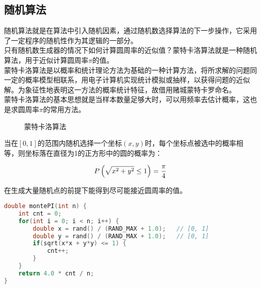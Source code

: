 \vspace{0.5cm}

\subsection{随机算法}

随机算法就是在算法中引入随机因素，通过随机数选择算法的下一步操作，它采用了一定程序的随机性作为其逻辑的一部分。\\

只有随机数生成器的情况下如何计算圆周率的近似值？蒙特卡洛算法就是一种随机算法，用于近似计算圆周率$ \pi $的值。\\

蒙特卡洛算法是以概率和统计理论方法为基础的一种计算方法，将所求解的问题同一定的概率模型相联系，用电子计算机实现统计模拟或抽样，以获得问题的近似解。为象征性地表明这一方法的概率统计特征，故借用赌城蒙特卡罗命名。\\

蒙特卡洛算法的基本思想就是当样本数量足够大时，可以用频率去估计概率，这也是求圆周率$ \pi $的常用方法。

\begin{figure}[H]
	\centering
	\caption{蒙特卡洛算法}
\end{figure}

当在$ [0, 1] $的范围内随机选择一个坐标$ (x, y) $时，每个坐标点被选中的概率相等，则坐标落在直径为1的正方形中的圆的概率为：

$$
	P \left( \sqrt{x^2 + y^2} \le 1 \right) = {\pi \over 4}
$$

在生成大量随机点的前提下能得到尽可能接近圆周率的值。\\


\begin{lstlisting}[language=C]
double montePI(int n) {
	int cnt = 0;
	for(int i = 0; i < n; i++) {
		double x = rand() / (RAND_MAX + 1.0);   // [0, 1]
		double y = rand() / (RAND_MAX + 1.0);   // [0, 1]
		if(sqrt(x*x + y*y) <= 1) {
			cnt++;
		}
	}
	return 4.0 * cnt / n;
}
\end{lstlisting}

\newpage